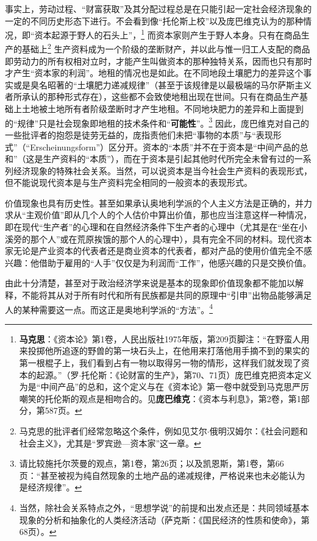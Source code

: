 \documentclass[fontset=fandol, a4paper, 12pt, openright]{ctexbook}
\begin{document}
事实上，劳动过程、“财富获取”及其分配过程总是在只能引起一定社会经济现象的一定的不同历史形态下进行。不会看到像“托伦斯上校”以及庞巴维克认为的那种情况，即“资本起源于野人的石头上”，\footnote{\textbf{马克思}：《资本论》第1卷，人民出版社1975年版，第209页脚注：“在野蛮人用来投掷他所追逐的野兽的第一块石头上，在他用来打落他用手摘不到的果实的第一根棍子上，我们看到占有一物以取得另一物的情形，这样我们就发现了资本的起源。”（罗$\cdot$托伦斯：《论财富的生产》，第70、71页）庞巴维克把资本定义为是“中间产品”的总和，这个定义与在《资本论》第一卷中就受到马克思严厉嘲笑的托伦斯的观点是相吻合的。见\textbf{庞巴维克}：《资本与利息》，第2卷，第1部分，第587页。} 而资本家则产生于野人本身。只有在商品生产的基础上\footnote{马克思的批评者们经常忽略这个条件，例如见艾尔$\cdot$俄明汉姆尔：《社会问题和社会主义》，尤其是“罗宾逊—资本家”这一章。} 生产资料成为一个阶级的垄断财产，并以此与惟一归工人支配的商品即劳动力的所有权相对立时，才能产生叫做资本的那种独特关系，因而也只有那时才产生“资本家的利润”。地租的情况也是如此。在不同地段土壤肥力的差异这个事实或是臭名昭著的“土壤肥力递减规律”（甚至于该规律是以最极端的马尔萨斯主义者所承认的那种形式存在），这些都不会致使地租出现在世间。只有在商品生产基础上土地被土地所有者阶级垄断时才产生地租。不同地块肥力的差异和上面提到的“规律”只是社会现象即地租的技术条件和“\textbf{可能性}”。\footnote{请比较施托尔茨曼的观点，第1卷，第26页；以及凯恩斯，第1卷，第66页：“甚至被视为纯自然现象的土地产品的递减规律，严格说来也未必能认为是经济规律”。} 因此，庞巴维克对自己的一些批评者的抱怨是徒劳无益的，庞指责他们未把“事物的本质”与“表现形式”（“Erscheinungsform”）区分开。资本的“本质”并不在于资本是“中间产品的总和”（这是生产资料的“本质”），而在于资本是引起其他时代所完全未曾有过的一系列经济现象的特殊社会关系。当然，可以说资本是当今社会生产资料的表现形式，但不能说现代资本是与生产资料完全相同的一般资本的表现形式。

价值现象也具有历史性。甚至如果承认奥地利学派的个人主义方法是正确的，并力求从“主观价值”即从几个人的个人估价中算出价值，那也应当注意这样一种情况，即在现代“生产者”的心理和在自然经济条件下生产者的心理中（尤其是在“坐在小溪旁的那个人”或在荒原挨饿的那个人的心理中），具有完全不同的材料。现代资本家无论是产业资本的代表者还是商业资本的代表者，都对产品的使用价值完全不感兴趣：他借助于雇用的“人手”仅仅是为利润而“工作”，他感兴趣的只是交换价值。

由此十分清楚，甚至对于政治经济学来说是基本的现象即价值现象都不能加以解释，不能将其从对于所有时代和所有民族都是共同的原理中“引申”出物品能够满足人的某种需要这一点。而这正是奥地利学派的“方法”。\footnote{当然，除社会关系特点之外，“思想学说”的前提和出发点还是：共同领域基本现象的分析和抽象化的人类经济活动（萨克斯：《国民经济的性质和使命》，第68页）。}
\end{document}
